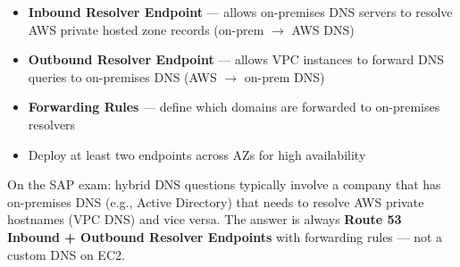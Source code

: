 \begin{keyfacts}
\begin{itemize}
  \item \textbf{Inbound Resolver Endpoint} --- allows on-premises DNS servers to resolve AWS private hosted zone records (on-prem $\to$ AWS DNS)
  \item \textbf{Outbound Resolver Endpoint} --- allows VPC instances to forward DNS queries to on-premises DNS (AWS $\to$ on-prem DNS)
  \item \textbf{Forwarding Rules} --- define which domains are forwarded to on-premises resolvers
  \item Deploy at least two endpoints across AZs for high availability
\end{itemize}
\end{keyfacts}

\begin{examtip}
On the SAP exam: hybrid DNS questions typically involve a company that has on-premises DNS (e.g., Active Directory) that needs to resolve AWS private hostnames (VPC DNS) and vice versa. The answer is always \textbf{Route 53 Inbound + Outbound Resolver Endpoints} with forwarding rules --- not a custom DNS on EC2.
\end{examtip}

